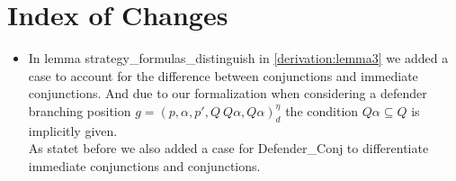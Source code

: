 \section{Index of Changes}

\begin{itemize}
   \item In lemma strategy\_formulas\_distinguish in  \ref{derivation:lemma3} we added a case to account for the difference between 
conjunctions and immediate conjunctions. And due to our formalization when considering a
defender branching position $g=(p,\alpha ,p', Q \ Q\alpha, Q\alpha)_d^\eta$ the condition 
$Q \alpha \subseteq Q$ is implicitly given. \\
As statet before we also added a case for Defender\_Conj to differentiate immediate conjunctions and conjunctions.
\end{itemize}